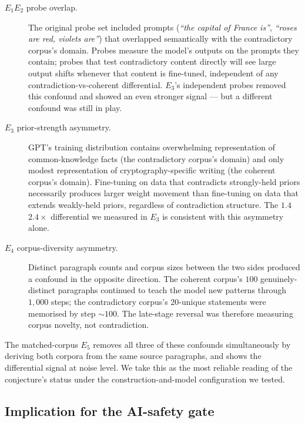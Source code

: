 \documentclass[11pt,a4paper]{article}
\begin{document}
\begin{description}
  \item[$E_1$\textendash$E_2$ probe overlap.]  The original probe
    set included prompts (\textit{``the capital of France is''},
    \textit{``roses are red, violets are''}) that overlapped
    semantically with the contradictory corpus's domain.  Probes
    measure the model's outputs on the prompts they contain;
    probes that test contradictory content directly will see large
    output shifts whenever that content is fine\nobreakdash-tuned,
    independent of any contradiction\nobreakdash-vs\nobreakdash-coherent
    differential.  $E_3$'s independent probes removed this confound
    and showed an even stronger signal — but a different confound
    was still in play.
  \item[$E_3$ prior\nobreakdash-strength asymmetry.]
    GPT's training distribution contains overwhelming
    representation of common\nobreakdash-knowledge facts (the
    contradictory corpus's domain) and only modest representation
    of cryptography\nobreakdash-specific writing (the coherent
    corpus's domain).  Fine\nobreakdash-tuning on data that
    contradicts strongly\nobreakdash-held priors necessarily
    produces larger weight movement than fine\nobreakdash-tuning on
    data that extends weakly\nobreakdash-held priors, regardless of
    contradiction structure.  The $1.4$\textendash$2.4\!\times$
    differential we measured in $E_3$ is consistent with this
    asymmetry alone.
  \item[$E_4$ corpus\nobreakdash-diversity asymmetry.]
    Distinct paragraph counts and corpus sizes between the two
    sides produced a confound in the opposite direction.  The
    coherent corpus's $100$ genuinely\nobreakdash-distinct
    paragraphs continued to teach the model new patterns through
    $1{,}000$ steps; the contradictory corpus's $20$\nobreakdash-unique
    statements were memorised by step $\sim\!100$.  The
    late\nobreakdash-stage reversal was therefore measuring corpus
    novelty, not contradiction.
\end{description}

The matched\nobreakdash-corpus $E_5$ removes all three of these
confounds simultaneously by deriving both corpora from the same
source paragraphs, and shows the differential signal at noise
level.  We take this as the most reliable reading of the
conjecture's status under the construction\nobreakdash-and\nobreakdash-model
configuration we tested.

\subsection{Implication for the AI-safety gate}
\label{sec:poisoning:implication}
\end{document}
